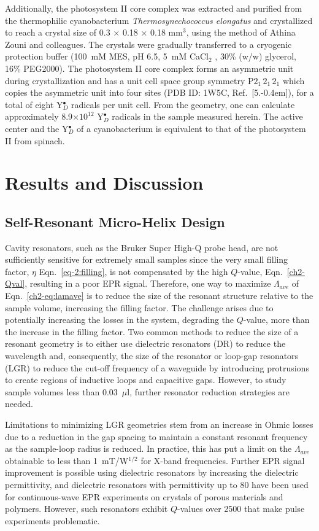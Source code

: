 Additionally, the photosystem II core complex was extracted and purified from the thermophilic cyanobacterium {\em Thermosynechococcus elongatus} and crystallized to reach a crystal size of 0.3 $\times$ 0.18 $\times$ 0.18 mm$^3$, using the method of Athina Zouni and colleagues. \cite{KERN2005147} The crystals were gradually transferred to a cryogenic protection buffer (100~mM MES, pH 6.5, 5~mM CaCl$_2$ , 30\% (w/w) glycerol, 16\% PEG2000). The photosystem II core complex forms an asymmetric unit during crystallization and has a unit cell space group symmetry P${2_1\,2_1\,2_1}$ which copies the asymmetric unit into four sites (PDB ID: 1W5C, Ref.~[5.\kern-0.4em]), for a total of eight Y$_D^\bullet$ radicals per unit cell. From the geometry, one can calculate approximately 8.9$\times10^{12}$ Y$_D^\bullet$ radicals in the sample measured herein. The active center and the Y$_D^\bullet$ of a cyanobacterium is equivalent to that of the photosystem II from spinach. 

\section{Results and Discussion}
\subsection{Self-Resonant Micro-Helix Design}
Cavity resonators, such as the Bruker Super High-Q probe head, are not sufficiently sensitive for extremely small samples since the very small filling factor, $\eta$ Eqn.~\ref{eq-2:filling}, is not compensated by the high $Q$-value, Eqn.~\ref{ch2-Qval}, resulting in a poor EPR signal. \cite{ReijerseSavitsky2017} Therefore, one way to maximize $\Lambda_{ave}$ of Eqn.~\ref{ch2-eq:lamave} is to reduce the size of the resonant structure relative to the sample volume, increasing the filling factor. The challenge arises due to potentially increasing the losses in the system, degrading the $Q$-value, more than the increase in the filling factor. Two common methods to reduce the size of a resonant geometry is to either use dielectric resonators (DR) to reduce the wavelength and, consequently, the size of the resonator or loop-gap resonators (LGR) to reduce the cut-off frequency of a waveguide by introducing protrusions to create regions of inductive loops and capacitive gaps. However, to study sample volumes less than 0.03~$\mu$l, further resonator reduction strategies are needed.

Limitations to minimizing LGR geometries stem from an increase in Ohmic losses due to a reduction in the gap spacing to maintain a constant resonant frequency as the sample-loop radius is reduced. In practice, this has put a limit on the $\Lambda_{ave}$ obtainable to less than 1~mT/W$^{1/2}$ for X-band frequencies. Further EPR signal improvement is possible using dielectric resonators by increasing the dielectric permittivity, and dielectric resonators with permittivity up to 80 have been used for continuous-wave EPR experiments on crystals of porous materials and polymers. \cite{dielectricReson1, dielectricReson2} However, such resonators exhibit $Q$-values over 2500 that make pulse experiments problematic. \cite{Friedlaender2015} 

